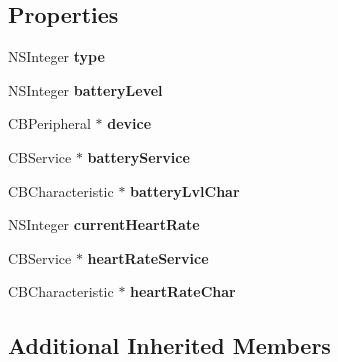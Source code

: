 \subsection*{Properties}
\begin{DoxyCompactItemize}
\item 
\hypertarget{interface_wahoo_tickr_x_a96e73fccf071a4f3406e51a833a4756a}{N\-S\-Integer {\bfseries type}}\label{interface_wahoo_tickr_x_a96e73fccf071a4f3406e51a833a4756a}

\item 
\hypertarget{interface_wahoo_tickr_x_a36e3426d855a4cb1ea5495afb7d5818c}{N\-S\-Integer {\bfseries battery\-Level}}\label{interface_wahoo_tickr_x_a36e3426d855a4cb1ea5495afb7d5818c}

\item 
\hypertarget{interface_wahoo_tickr_x_a1150e7cbd797825676de42644f16bb93}{C\-B\-Peripheral $\ast$ {\bfseries device}}\label{interface_wahoo_tickr_x_a1150e7cbd797825676de42644f16bb93}

\item 
\hypertarget{interface_wahoo_tickr_x_a4dc92d682d3e9734886c0356bdb86bbf}{C\-B\-Service $\ast$ {\bfseries battery\-Service}}\label{interface_wahoo_tickr_x_a4dc92d682d3e9734886c0356bdb86bbf}

\item 
\hypertarget{interface_wahoo_tickr_x_a664a0a704cfea55c60ddf4dbcad3bf35}{C\-B\-Characteristic $\ast$ {\bfseries battery\-Lvl\-Char}}\label{interface_wahoo_tickr_x_a664a0a704cfea55c60ddf4dbcad3bf35}

\item 
\hypertarget{interface_wahoo_tickr_x_a83d9f36650e71b239075074c551a0185}{N\-S\-Integer {\bfseries current\-Heart\-Rate}}\label{interface_wahoo_tickr_x_a83d9f36650e71b239075074c551a0185}

\item 
\hypertarget{interface_wahoo_tickr_x_ae712f8d6cd74c8fb0b1093f45e7ee6e3}{C\-B\-Service $\ast$ {\bfseries heart\-Rate\-Service}}\label{interface_wahoo_tickr_x_ae712f8d6cd74c8fb0b1093f45e7ee6e3}

\item 
\hypertarget{interface_wahoo_tickr_x_a8d2500c6e9eb3493393631b3bad7f7e7}{C\-B\-Characteristic $\ast$ {\bfseries heart\-Rate\-Char}}\label{interface_wahoo_tickr_x_a8d2500c6e9eb3493393631b3bad7f7e7}

\end{DoxyCompactItemize}
\subsection*{Additional Inherited Members}


